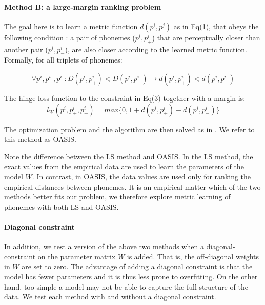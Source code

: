 \paragraph{Method B: a large-margin ranking problem} The goal here is to learn a metric function $d(p^i, p^j)$ as in Eq(1), that obeys the following condition \citep{Chechik2010}: a pair of phonemes ($p^i, p^i_+$) that are perceptually closer than another pair ($p^i, p^i_-$), are also closer according to the learned metric function. Formally, for all triplets of phonemes:

\begin{equation}
\forall{p^i, p^i_+, p^i_-}: D(p^i, p^i_+)<D(p^i, p^i_-) \rightarrow d(p^i, p^i_+)<d(p^i, p^i_-)
\end{equation}

The hinge-loss function to the constraint in Eq(3) together with a margin is:
\begin{equation}
    l_W(p^i, p^i_+, p^i_-) = max\{0, 1 + d(p^i, p^i_+) - d(p^i, p^i_-)\}
\end{equation}

The optimization problem and the algorithm are then solved as in \citet{Chechik2010}. We refer to this method as OASIS.

Note the difference between the LS method and OASIS. In the LS method, the exact values from the empirical data are used to learn the parameters of the model $W$. In contrast, in OASIS, the data values are used only for ranking the empirical distances between phonemes. It is an empirical matter which of the two methods better fits our problem, we therefore explore metric learning of phonemes with both LS and OASIS.

\paragraph{Diagonal constraint} In addition, we test a version of the above two methods when a diagonal-constraint on the parameter matrix $W$ is added. That is, the off-diagonal weights in $W$ are set to zero. The advantage of adding a diagonal constraint is that the model has fewer parameters and it is thus less prone to overfitting. On the other hand, too simple a model may not be able to capture the full structure of the data. We test each method with and without a diagonal constraint. 
